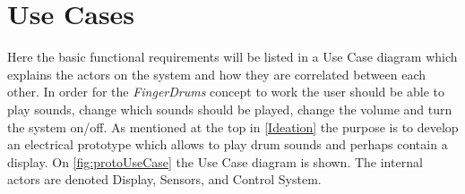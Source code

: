 \section{Use Cases}
\label{UseCase}
Here the basic functional requirements will be listed in a Use Case diagram which explains the actors on the system and how they are correlated between each other.
In order for the \textit{FingerDrums} concept to work the user should be able to play sounds, change which sounds should be played, change the volume and turn the system on/off. As mentioned at the top in \autoref{Ideation} the purpose is to develop an electrical prototype which allows to play drum sounds and perhaps contain a display. On \autoref{fig:protoUseCase} the Use Case diagram is shown. The internal actors are denoted Display, Sensors, and Control System. 


